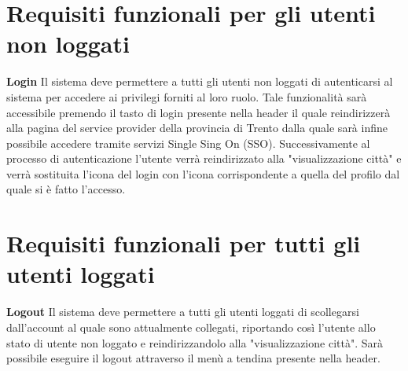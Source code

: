     \section{Requisiti funzionali per gli utenti non loggati}
        \begin{rfList}
            \rfItem \textbf{Login} Il sistema deve permettere a tutti gli utenti non loggati di autenticarsi al sistema per accedere ai privilegi forniti al loro ruolo. Tale funzionalità sarà accessibile premendo il tasto di login presente nella header il quale reindirizzerà alla pagina del service provider della provincia di Trento dalla quale sarà infine possibile accedere tramite servizi Single Sing On (SSO). Successivamente al processo di autenticazione l'utente verrà reindirizzato alla "visualizzazione città" e verrà sostituita l'icona del login con l'icona corrispondente a quella del profilo dal quale si è fatto l'accesso.
        \end{rfList}
    \section{Requisiti funzionali per tutti gli utenti loggati}
        \begin{rfList}
            \rfItem \textbf{Logout} Il sistema deve permettere a tutti gli utenti loggati di scollegarsi dall'account al quale sono attualmente collegati, riportando così l'utente allo stato di utente non loggato e reindirizzandolo alla "visualizzazione città". Sarà possibile eseguire il logout attraverso il menù a tendina presente nella header.
        \end{rfList}     
